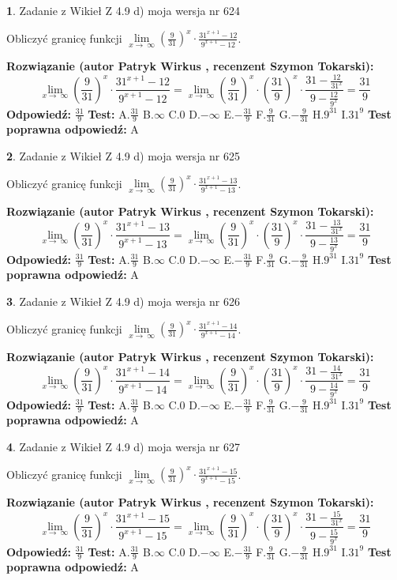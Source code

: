 \documentclass[12pt, a4paper]{article}
\theoremstyle{definition} %
\newtheorem{zad}{}
\newcommand{\zadStart}[1]{\begin{zad}#1\newline}
\newcommand{\zadStop}{\end{zad}}
\newcommand{\rozwStart}[2]{\noindent \textbf{Rozwiązanie (autor #1 , recenzent #2): }\newline}
\newcommand{\rozwStop}{\newline}
\newcommand{\odpStart}{\noindent \textbf{Odpowiedź:}\newline}
\newcommand{\odpStop}{\newline}
\newcommand{\testStart}{\noindent \textbf{Test:}\newline}
\newcommand{\testStop}{\newline}
\newcommand{\kluczStart}{\noindent \textbf{Test poprawna odpowiedź:}\newline}
\newcommand{\kluczStop}{\newline}
\begin{document}
\zadStart{Zadanie z Wikieł Z 4.9 d) moja wersja nr 624}


Obliczyć granicę funkcji  $\lim\limits_{x\to\ \infty}(\frac{9}{31})^{x}\cdot\frac{31^{x+1}-12}{9^{x+1}-12}$.
\zadStop
\rozwStart{Patryk Wirkus}{Szymon Tokarski}
$$\lim\limits_{x\to\ \infty}(\frac{9}{31})^{x}\cdot\frac{31^{x+1}-12}{9^{x+1}-12}=\lim\limits_{x\to\ \infty}(\frac{9}{31})^{x}\cdot(\frac{31}{9})^{x} \cdot \frac{31-\frac{12}{31^{x}}}{9-\frac{12}{9^{x}}} = \frac{31}{9}$$
\rozwStop
\odpStart
$\frac{31}{9}$
\odpStop
\testStart
A.$\frac{31}{9}$ B.$\infty$ C.$0$ D.$-\infty$ E.$-\frac{31}{9}$
F.$\frac{9}{31}$ G.$-\frac{9}{31}$
H.$9^{31}$
I.$31^{9}$
\testStop
\kluczStart
A
\kluczStop



\zadStart{Zadanie z Wikieł Z 4.9 d) moja wersja nr 625}


Obliczyć granicę funkcji  $\lim\limits_{x\to\ \infty}(\frac{9}{31})^{x}\cdot\frac{31^{x+1}-13}{9^{x+1}-13}$.
\zadStop
\rozwStart{Patryk Wirkus}{Szymon Tokarski}
$$\lim\limits_{x\to\ \infty}(\frac{9}{31})^{x}\cdot\frac{31^{x+1}-13}{9^{x+1}-13}=\lim\limits_{x\to\ \infty}(\frac{9}{31})^{x}\cdot(\frac{31}{9})^{x} \cdot \frac{31-\frac{13}{31^{x}}}{9-\frac{13}{9^{x}}} = \frac{31}{9}$$
\rozwStop
\odpStart
$\frac{31}{9}$
\odpStop
\testStart
A.$\frac{31}{9}$ B.$\infty$ C.$0$ D.$-\infty$ E.$-\frac{31}{9}$
F.$\frac{9}{31}$ G.$-\frac{9}{31}$
H.$9^{31}$
I.$31^{9}$
\testStop
\kluczStart
A
\kluczStop



\zadStart{Zadanie z Wikieł Z 4.9 d) moja wersja nr 626}


Obliczyć granicę funkcji  $\lim\limits_{x\to\ \infty}(\frac{9}{31})^{x}\cdot\frac{31^{x+1}-14}{9^{x+1}-14}$.
\zadStop
\rozwStart{Patryk Wirkus}{Szymon Tokarski}
$$\lim\limits_{x\to\ \infty}(\frac{9}{31})^{x}\cdot\frac{31^{x+1}-14}{9^{x+1}-14}=\lim\limits_{x\to\ \infty}(\frac{9}{31})^{x}\cdot(\frac{31}{9})^{x} \cdot \frac{31-\frac{14}{31^{x}}}{9-\frac{14}{9^{x}}} = \frac{31}{9}$$
\rozwStop
\odpStart
$\frac{31}{9}$
\odpStop
\testStart
A.$\frac{31}{9}$ B.$\infty$ C.$0$ D.$-\infty$ E.$-\frac{31}{9}$
F.$\frac{9}{31}$ G.$-\frac{9}{31}$
H.$9^{31}$
I.$31^{9}$
\testStop
\kluczStart
A
\kluczStop



\zadStart{Zadanie z Wikieł Z 4.9 d) moja wersja nr 627}


Obliczyć granicę funkcji  $\lim\limits_{x\to\ \infty}(\frac{9}{31})^{x}\cdot\frac{31^{x+1}-15}{9^{x+1}-15}$.
\zadStop
\rozwStart{Patryk Wirkus}{Szymon Tokarski}
$$\lim\limits_{x\to\ \infty}(\frac{9}{31})^{x}\cdot\frac{31^{x+1}-15}{9^{x+1}-15}=\lim\limits_{x\to\ \infty}(\frac{9}{31})^{x}\cdot(\frac{31}{9})^{x} \cdot \frac{31-\frac{15}{31^{x}}}{9-\frac{15}{9^{x}}} = \frac{31}{9}$$
\rozwStop
\odpStart
$\frac{31}{9}$
\odpStop
\testStart
A.$\frac{31}{9}$ B.$\infty$ C.$0$ D.$-\infty$ E.$-\frac{31}{9}$
F.$\frac{9}{31}$ G.$-\frac{9}{31}$
H.$9^{31}$
I.$31^{9}$
\testStop
\kluczStart
A
\kluczStop
\end{document}
